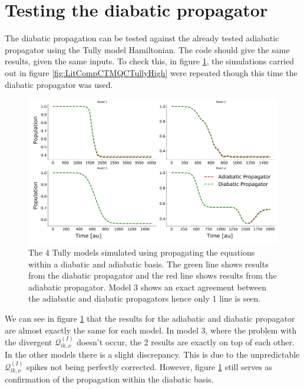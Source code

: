 \section{Testing the diabatic propagator}
The diabatic propagation can be tested against the already tested adiabatic propagator using the Tully model Hamiltonian. The code should give the same results, given the same inputs. To check this, in figure \ref{fig:diab_prop_vs_adiab}, the simulations carried out in figure \ref{fig:LitCompCTMQCTullyHigh} were repeated though this time the diabatic propagator was used.
\begin{figure}[ht]
  \includegraphics[width=\textwidth]{../img/CTMQC/TullyModels/CTMQC_ad_vs_di_wTraj_pops.png}
  \caption{\label{fig:diab_prop_vs_adiab}The 4 Tully models simulated using propagating the equations within a diabatic and adiabatic basis. The green line shows results from the diabatic propagator and the red line shows results from the adiabatic propagator. Model 3 shows an exact agreement between the adiabatic and diabatic propagators hence only 1 line is seen.}
\end{figure}
We can see in figure \ref{fig:diab_prop_vs_adiab} that the results for the adiabatic and diabatic propagator are almost exactly the same for each model. In model 3, where the problem with the divergent $\mathcal{Q}_{lk, \nu}^{(I)}$ doesn't occur, the 2 results are exactly on top of each other. In the other models there is a slight discrepancy. This is due to the unpredictable $\mathcal{Q}_{lk, \nu}^{(I)}$ spikes not being perfectly corrected. However, figure \ref{fig:diab_prop_vs_adiab} still serves as confirmation of the propagation within the diabatic basis.

